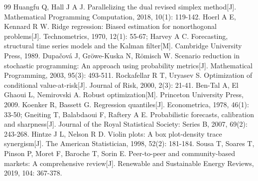 \documentclass[withoutpreface,bwprint]{cumcmthesis} %
\begin{document}
\begin{thebibliography}{99}
 Huangfu Q, Hall J A J. Parallelizing the dual revised simplex method[J]. Mathematical Programming Computation, 2018, 10(1): 119-142.
 Hoerl A E, Kennard R W. Ridge regression: Biased estimation for nonorthogonal problems[J]. Technometrics, 1970, 12(1): 55-67; Harvey A C. Forecasting, structural time series models and the Kalman filter[M]. Cambridge University Press, 1989.
 Dupa\v{c}ov\'a J, Gr\"owe-Kuska N, R\"omisch W. Scenario reduction in stochastic programming: An approach using probability metrics[J]. Mathematical Programming, 2003, 95(3): 493-511.
 Rockafellar R T, Uryasev S. Optimization of conditional value-at-risk[J]. Journal of Risk, 2000, 2(3): 21-41.
 Ben-Tal A, El Ghaoui L, Nemirovski A. Robust optimization[M]. Princeton University Press, 2009.
 Koenker R, Bassett G. Regression quantiles[J]. Econometrica, 1978, 46(1): 33-50; Gneiting T, Balabdaoui F, Raftery A E. Probabilistic forecasts, calibration and sharpness[J]. Journal of the Royal Statistical Society: Series B, 2007, 69(2): 243-268.
 Hintze J L, Nelson R D. Violin plots: A box plot-density trace synergism[J]. The American Statistician, 1998, 52(2): 181-184.
 Sousa T, Soares T, Pinson P, Moret F, Baroche T, Sorin E. Peer-to-peer and community-based markets: A comprehensive review[J]. Renewable and Sustainable Energy Reviews, 2019, 104: 367-378.
\end{thebibliography}


\newpage




\end{document}
